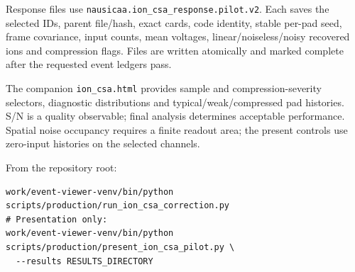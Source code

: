 \documentclass[10pt,a4paper]{article}
\begin{document}
Response files use \texttt{nausicaa.ion\_csa\_response.pilot.v2}. Each saves the
selected IDs, parent file/hash, exact cards, code identity, stable per-pad seed,
frame covariance, input counts, mean voltages, linear/noiseless/noisy recovered
ions and compression flags. Files are written atomically and marked complete
after the requested event ledgers pass.

The companion \texttt{ion\_csa.html} provides sample and compression-severity
selectors, diagnostic distributions and typical/weak/compressed pad histories.
S/N is a quality observable; final analysis determines acceptable performance.
Spatial noise occupancy requires a finite readout area; the present controls
use zero-input histories on the selected channels.

From the repository root:
\begin{verbatim}
work/event-viewer-venv/bin/python scripts/production/run_ion_csa_correction.py
# Presentation only:
work/event-viewer-venv/bin/python scripts/production/present_ion_csa_pilot.py \
  --results RESULTS_DIRECTORY
\end{verbatim}
\end{document}
